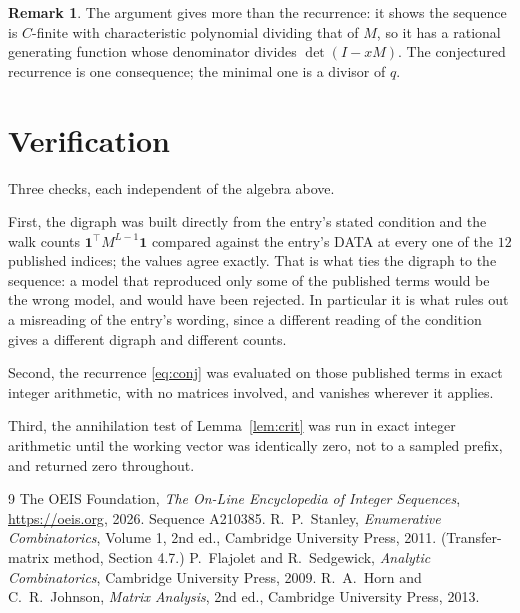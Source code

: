 \documentclass[11pt,a4paper]{article}
\theoremstyle{plain}
\theoremstyle{definition}
\newtheorem{remark}[theorem]{Remark}
\begin{document}
\begin{remark}
The argument gives more than the recurrence: it shows the sequence is $C$-finite with
characteristic polynomial dividing that of $M$, so it has a rational generating function
whose denominator divides $\det(I-xM)$. The conjectured recurrence is one consequence; the
minimal one is a divisor of $q$.
\end{remark}

\section{Verification}

Three checks, each independent of the algebra above.

First, the digraph was built directly from the entry's stated condition and the walk counts
$\mathbf{1}^{\!\top}M^{L-1}\mathbf{1}$ compared against the entry's DATA at
every one of the $12$ published indices; the values agree exactly. That is what ties
the digraph to the sequence: a model that reproduced only some of the published terms would
be the wrong model, and would have been rejected. In particular it is what rules out a
misreading of the entry's wording, since a different reading of the condition gives a
different digraph and different counts.

Second, the recurrence \eqref{eq:conj} was evaluated on those published terms in exact
integer arithmetic, with no matrices involved, and vanishes wherever it applies.

Third, the annihilation test of Lemma~\ref{lem:crit} was run in exact integer arithmetic
until the working vector was identically zero, not to a sampled prefix, and returned zero
throughout.

\begin{thebibliography}{9}
 The OEIS Foundation, \emph{The On-Line Encyclopedia of Integer
Sequences}, \url{https://oeis.org}, 2026. Sequence A210385.
 R.~P.~Stanley, \emph{Enumerative Combinatorics}, Volume 1, 2nd ed.,
Cambridge University Press, 2011. (Transfer-matrix method, Section 4.7.)
 P.~Flajolet and R.~Sedgewick, \emph{Analytic Combinatorics}, Cambridge
University Press, 2009.
 R.~A.~Horn and C.~R.~Johnson, \emph{Matrix Analysis}, 2nd ed., Cambridge
University Press, 2013.
\end{thebibliography}
\end{document}
